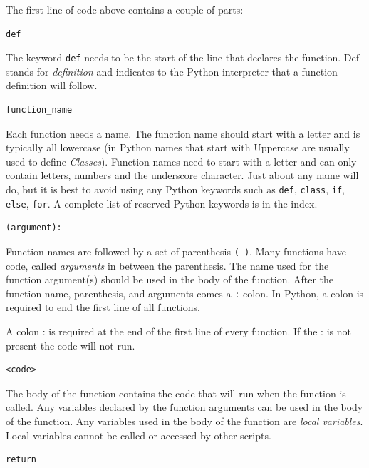 \documentclass{book}
\begin{document}
The first line of code above contains a couple of parts:

\begin{lstlisting}
def
\end{lstlisting}

The keyword \lstinline!def! needs to be the start of the line that
declares the function. Def stands for \emph{definition} and indicates to
the Python interpreter that a function definition will follow.

\begin{lstlisting}
function_name
\end{lstlisting}

Each function needs a name. The function name should start with a letter
and is typically all lowercase (in Python names that start with
Uppercase are usually used to define \emph{Classes}). Function names
need to start with a letter and can only contain letters, numbers and
the underscore character. Just about any name will do, but it is best to
avoid using any Python keywords such as \lstinline!def!,
\lstinline!class!, \lstinline!if!, \lstinline!else!, \lstinline!for!. A
complete list of reserved Python keywords is in the index.

\begin{lstlisting}
(argument):
\end{lstlisting}

Function names are followed by a set of parenthesis \lstinline!( )!.
Many functions have code, called \emph{arguments} in between the
parenthesis. The name used for the function argument(s) should be used
in the body of the function. After the function name, parenthesis, and
arguments comes a \lstinline!:! colon. In Python, a colon is required to
end the first line of all functions.

A colon : is required at the end of the first line of every function. If
the : is not present the code will not run.

\begin{lstlisting}
<code>
\end{lstlisting}

The body of the function contains the code that will run when the
function is called. Any variables declared by the function arguments can
be used in the body of the function. Any variables used in the body of
the function are \emph{local variables}. Local variables cannot be
called or accessed by other scripts.

\begin{lstlisting}
return
\end{lstlisting}
\end{document}
